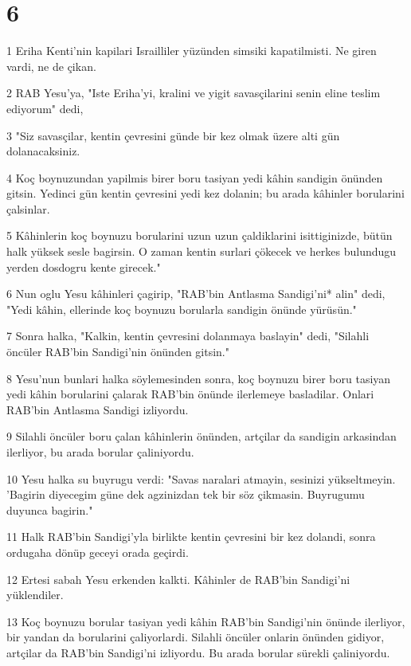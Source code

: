 \chapter{6}

\par 1 Eriha Kenti'nin kapilari Israilliler yüzünden simsiki kapatilmisti. Ne giren vardi, ne de çikan.
\par 2 RAB Yesu'ya, "Iste Eriha'yi, kralini ve yigit savasçilarini senin eline teslim ediyorum" dedi,
\par 3 "Siz savasçilar, kentin çevresini günde bir kez olmak üzere alti gün dolanacaksiniz.
\par 4 Koç boynuzundan yapilmis birer boru tasiyan yedi kâhin sandigin önünden gitsin. Yedinci gün kentin çevresini yedi kez dolanin; bu arada kâhinler borularini çalsinlar.
\par 5 Kâhinlerin koç boynuzu borularini uzun uzun çaldiklarini isittiginizde, bütün halk yüksek sesle bagirsin. O zaman kentin surlari çökecek ve herkes bulundugu yerden dosdogru kente girecek."
\par 6 Nun oglu Yesu kâhinleri çagirip, "RAB'bin Antlasma Sandigi'ni* alin" dedi, "Yedi kâhin, ellerinde koç boynuzu borularla sandigin önünde yürüsün."
\par 7 Sonra halka, "Kalkin, kentin çevresini dolanmaya baslayin" dedi, "Silahli öncüler RAB'bin Sandigi'nin önünden gitsin."
\par 8 Yesu'nun bunlari halka söylemesinden sonra, koç boynuzu birer boru tasiyan yedi kâhin borularini çalarak RAB'bin önünde ilerlemeye basladilar. Onlari RAB'bin Antlasma Sandigi izliyordu.
\par 9 Silahli öncüler boru çalan kâhinlerin önünden, artçilar da sandigin arkasindan ilerliyor, bu arada borular çaliniyordu.
\par 10 Yesu halka su buyrugu verdi: "Savas naralari atmayin, sesinizi yükseltmeyin. 'Bagirin diyecegim güne dek agzinizdan tek bir söz çikmasin. Buyrugumu duyunca bagirin."
\par 11 Halk RAB'bin Sandigi'yla birlikte kentin çevresini bir kez dolandi, sonra ordugaha dönüp geceyi orada geçirdi.
\par 12 Ertesi sabah Yesu erkenden kalkti. Kâhinler de RAB'bin Sandigi'ni yüklendiler.
\par 13 Koç boynuzu borular tasiyan yedi kâhin RAB'bin Sandigi'nin önünde ilerliyor, bir yandan da borularini çaliyorlardi. Silahli öncüler onlarin önünden gidiyor, artçilar da RAB'bin Sandigi'ni izliyordu. Bu arada borular sürekli çaliniyordu.

